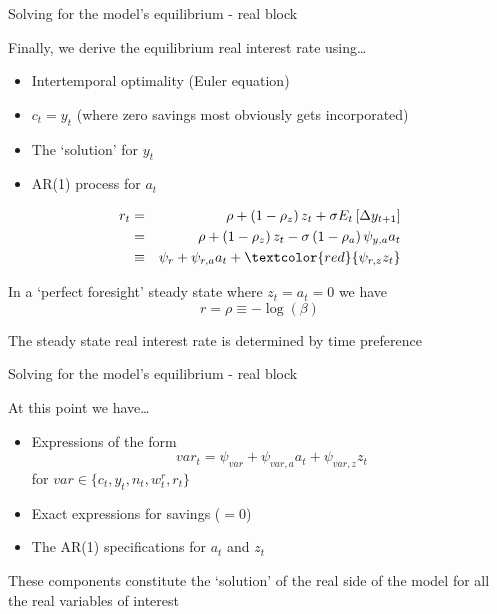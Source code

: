 \begin{frame}{Solving for the model's equilibrium - real block}

Finally, we derive the equilibrium real interest rate using\ldots
\begin{itemize}
\item	Intertemporal optimality (Euler equation)
\item	$c_{t}=y_{t}$ (where zero savings most obviously gets incorporated)
\item	The `solution' for $y_{t}$
\item	AR(1) process for $a_{t}$
\end{itemize}
\begin{eqnarray*}
r_{t} &=& \rho + \left(1-\rho_{z}\right)z_{t} + \sigma E_{t}\left[ \Delta y_{t+1} \right] \\
	&=& \rho + \left(1-\rho_{z}\right)z_{t} - \sigma \left( 1-\rho_{a} \right) \psi_{y,a} a_{t} \\
	&\equiv& \psi_{r} + \psi_{r,a} a_{t} + \textcolor{red}{\psi_{r,z} z_{t}}
\end{eqnarray*}

In a `perfect foresight' steady state where $z_{t}=a_{t}=0$ we have
\[
r = \rho \equiv -\log{(\beta)}
\]

The steady state real interest rate is determined by time preference

\end{frame}




\begin{frame}{Solving for the model's equilibrium - real block}

At this point we have\ldots
\begin{itemize}
\item	Expressions of the form
\[
var_{t} = \psi_{var} + \psi_{var,a} a_{t} + \psi_{var,z} z_{t}
\]
for $var \in \{ c_{t}, y_{t}, n_{t}, w^{r}_{t}, r_{t} \}$
\item	Exact expressions for savings ($=0$)%
\item	The AR(1) specifications for $a_{t}$ and $z_{t}$ 
\end{itemize}

\vspace{3mm}
These components constitute the `solution' of the real side of the model for all the real variables of interest

\end{frame}

